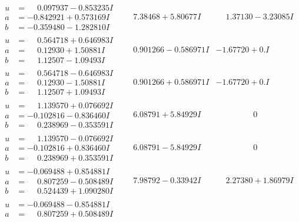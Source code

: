 \documentclass[1p]{elsarticle_modified}
\theoremstyle{definition}
\begin{document}
$$\begin{array}{c|c|c}
\begin{aligned}
u &= \phantom{-}0.097937 - 0.853235 I \\
a &= -0.842921 + 0.573169 I \\
b &= -0.359480 - 1.282810 I\end{aligned}
 & \phantom{-}7.38468 + 5.80677 I & \phantom{-}1.37130 - 3.23085 I \\ \hline\begin{aligned}
u &= \phantom{-}0.564718 + 0.646983 I \\
a &= \phantom{-}0.12930 + 1.50881 I \\
b &= \phantom{-}1.12507 - 1.09493 I\end{aligned}
 & \phantom{-}0.901266 - 0.586971 I & -1.67720 + 0. I\phantom{ +0.000000I} \\ \hline\begin{aligned}
u &= \phantom{-}0.564718 - 0.646983 I \\
a &= \phantom{-}0.12930 - 1.50881 I \\
b &= \phantom{-}1.12507 + 1.09493 I\end{aligned}
 & \phantom{-}0.901266 + 0.586971 I & -1.67720 + 0. I\phantom{ +0.000000I} \\ \hline\begin{aligned}
u &= \phantom{-}1.139570 + 0.076692 I \\
a &= -0.102816 - 0.836460 I \\
b &= \phantom{-}0.238969 - 0.353591 I\end{aligned}
 & \phantom{-}6.08791 + 5.84929 I & \phantom{-0.000000 } 0 \\ \hline\begin{aligned}
u &= \phantom{-}1.139570 - 0.076692 I \\
a &= -0.102816 + 0.836460 I \\
b &= \phantom{-}0.238969 + 0.353591 I\end{aligned}
 & \phantom{-}6.08791 - 5.84929 I & \phantom{-0.000000 } 0 \\ \hline\begin{aligned}
u &= -0.069488 + 0.854881 I \\
a &= \phantom{-}0.807259 - 0.508489 I \\
b &= \phantom{-}0.524439 + 1.090280 I\end{aligned}
 & \phantom{-}7.98792 - 0.33942 I & \phantom{-}2.27380 + 1.86979 I \\ \hline\begin{aligned}
u &= -0.069488 - 0.854881 I \\
a &= \phantom{-}0.807259 + 0.508489 I \\

\end{aligned}
\end{array}$$
\end{document}
